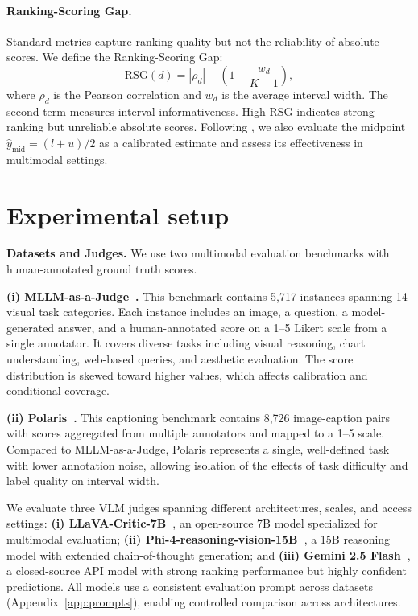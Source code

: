 \documentclass{article}
\begin{document}
\paragraph{Ranking-Scoring Gap.}
Standard metrics capture ranking quality but not the reliability of absolute scores. We define the Ranking-Scoring Gap:
\begin{equation}
\text{RSG}(d) = |\rho_d| - \left(1 - \frac{w_d}{K - 1}\right),
\end{equation}
where $\rho_d$ is the Pearson correlation and $w_d$ is the average interval width. The second term measures interval informativeness. High RSG indicates strong ranking but unreliable absolute scores. Following \citet{sheng2025analyzing}, we also evaluate the midpoint $\hat{y}_{\text{mid}} = (l + u)/2$ as a calibrated estimate and assess its effectiveness in multimodal settings.

\section{Experimental setup}
\label{sec:setup}

\textbf{Datasets and Judges.}
We use two multimodal evaluation benchmarks with human-annotated ground truth scores.

\textbf{(i) MLLM-as-a-Judge~\citep{chen2024mllmasajudge}.}
This benchmark contains 5,717 instances spanning 14 visual task categories. Each instance includes an image, a question, a model-generated answer, and a human-annotated score on a 1--5 Likert scale from a single annotator. It covers diverse tasks including visual reasoning, chart understanding, web-based queries, and aesthetic evaluation. The score distribution is skewed toward higher values, which affects calibration and conditional coverage.

\textbf{(ii) Polaris~\citep{wada2024polos}.}
This captioning benchmark contains 8,726 image-caption pairs with scores aggregated from multiple annotators and mapped to a 1--5 scale. Compared to MLLM-as-a-Judge, Polaris represents a single, well-defined task with lower annotation noise, allowing isolation of the effects of task difficulty and label quality on interval width.

We evaluate three VLM judges spanning different architectures, scales, and access settings: \textbf{(i) LLaVA-Critic-7B~\citep{xiong2024llavacritic}}, an open-source 7B model specialized for multimodal evaluation; \textbf{(ii) Phi-4-reasoning-vision-15B~\citep{abdin2025phi4reasoning}}, a 15B reasoning model with extended chain-of-thought generation; and \textbf{(iii) Gemini 2.5 Flash~\citep{google2025gemini25}}, a closed-source API model with strong ranking performance but highly confident predictions. All models use a consistent evaluation prompt across datasets (Appendix~\ref{app:prompts}), enabling controlled comparison across architectures.
\end{document}
